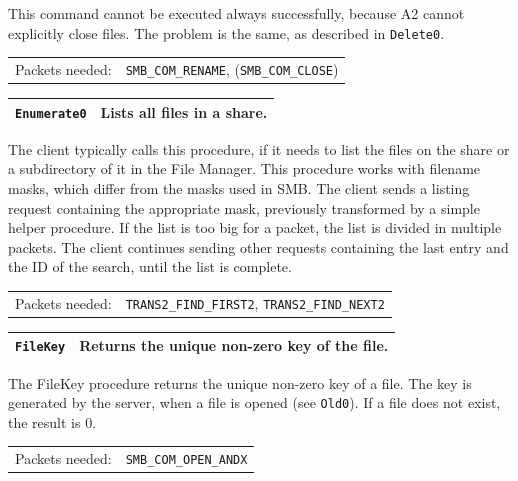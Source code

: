 \documentclass[11pt,a4paper]{book}
\begin{document}
This command cannot be executed always successfully, because A2 cannot explicitly close files. The problem is the same, as described in \texttt{Delete0}. \\
\renewcommand{\tabcolsep}{5mm}
\begin{tabular}{p{3cm}p{8cm}}
Packets needed: & \texttt{SMB\_COM\_RENAME}, (\texttt{SMB\_COM\_CLOSE}) \\
\end{tabular}

\begin{center}
\renewcommand{\tabcolsep}{5mm}
\begin{tabular}{p{3cm}p{8cm}}
\texttt{Enumerate0} & \textbf{Lists all files in a share.} \\ 
\hline
\end{tabular}
\end{center}
The client typically calls this procedure, if it needs to list the files on the share or a subdirectory of it in the File Manager. This procedure works with filename masks, which differ from the masks used in SMB. The client sends a listing request containing the appropriate mask, previously transformed by a simple helper procedure. If the list is too big for a packet, the list is divided in multiple packets. The client continues sending other requests containing the last entry and the ID of the search, until the list is complete. \\
\renewcommand{\tabcolsep}{5mm}
\begin{tabular}{p{3cm}p{8cm}}
Packets needed: & \texttt{TRANS2\_FIND\_FIRST2}, \texttt{TRANS2\_FIND\_NEXT2} \\
\end{tabular}

\begin{center}
\renewcommand{\tabcolsep}{5mm}
\begin{tabular}{p{3cm}p{8cm}}
\texttt{FileKey} & \textbf{Returns the unique non-zero key of the file.} \\ 
\hline
\end{tabular}
\end{center}
The FileKey procedure returns the unique non-zero key of a file. The key is generated by the server, when a file is opened (see \texttt{Old0}). If a file does not exist, the result is 0. \\
\renewcommand{\tabcolsep}{5mm}
\begin{tabular}{p{3cm}p{8cm}}
Packets needed: & \texttt{SMB\_COM\_OPEN\_ANDX} \\
\end{tabular}
\end{document}
